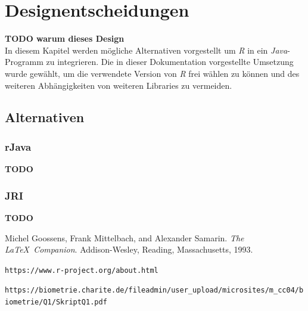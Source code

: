 \documentclass[a4paper, 12pt]{report} %
\begin{document}
\newpage


\chapter{Designentscheidungen}

\textbf{TODO warum dieses Design}\\


In diesem Kapitel werden mögliche Alternativen vorgestellt um \textit{R} in ein \textit{Java}-Programm zu integrieren.
Die in dieser Dokumentation vorgestellte Umsetzung wurde gewählt, um die verwendete Version von \textit{R} frei wählen zu können und des weiteren Abhängigkeiten von weiteren Libraries zu vermeiden.  

\section{Alternativen}

\subsection{rJava}

\textbf{TODO}

\subsection{JRI}

\textbf{TODO}





%

%
\begin{thebibliography}{9} %
Michel Goossens, Frank Mittelbach, and Alexander Samarin. 
\textit{The \LaTeX\ Companion}. 
Addison-Wesley, Reading, Massachusetts, 1993.
 

\texttt{https://www.r-project.org/about.html}

\texttt{https://biometrie.charite.de/fileadmin/user\_upload/microsites/m\_cc04/biometrie/Q1/SkriptQ1.pdf}

\end{thebibliography}
\end{document}
